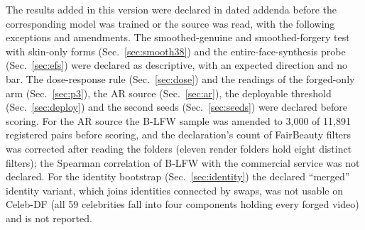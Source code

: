 \documentclass[10pt]{article}
\begin{document}
The results added in this version were declared in dated addenda before the corresponding model was trained or the source was
read, with the following exceptions and amendments. The smoothed-genuine and smoothed-forgery test with skin-only forms
(Sec.~\ref{sec:smooth38}) and the entire-face-synthesis probe (Sec.~\ref{sec:efs}) were declared as descriptive, with an expected
direction and no bar. The dose-response rule (Sec.~\ref{sec:dose}) and the readings of the forged-only arm (Sec.~\ref{sec:p3}), the
AR source (Sec.~\ref{sec:ar}), the deployable threshold (Sec.~\ref{sec:deploy}) and the second seeds (Sec.~\ref{sec:seeds}) were
declared before scoring. For the AR source the B-LFW sample was amended to 3,000 of 11,891 registered pairs before scoring, and the
declaration's count of FairBeauty filters was corrected after reading the folders (eleven render folders hold eight distinct
filters); the Spearman correlation of B-LFW with the commercial service was not declared. For the identity bootstrap
(Sec.~\ref{sec:identity}) the declared ``merged'' identity variant, which joins identities connected by swaps, was not usable on
Celeb-DF (all 59 celebrities fall into four components holding every forged video) and is not reported.
\end{document}
